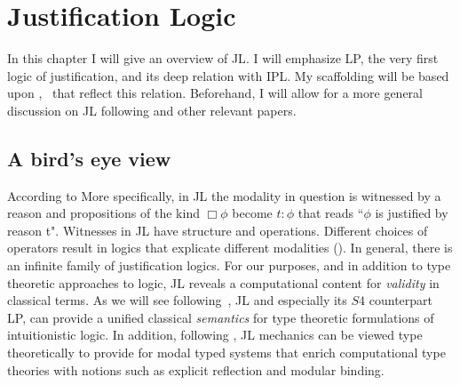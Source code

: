 \chapter{Justification Logic}\label{jllogic}
In this chapter I will give an overview of \ac {JL}. 
I will emphasize LP, 
the very first logic of justification, and its deep relation with 
\ac{IPL}. My scaffolding will be based upon \cite{Art01BSL},~\cite{Art95TR}  
that reflect this relation. Beforehand, I will allow for a more general discussion on 
\ac{JL} following \cite{sep-logic-justification} and other 
relevant papers.


\section{A bird's eye view}
According to \cite{sep-logic-justification}
 More specifically, in \ac{JL} the modality in question is witnessed by a reason and propositions of the kind $\Box\phi$ become $t:\phi$ that reads ``$\phi$ is justified by reason t". Witnesses in \ac{JL} have structure and operations. Different choices of operators result in logics that explicate different modalities 
 ({}). 
 In general, there is an infinite family of justification logics.
 For our purposes, and in addition to type theoretic approaches to logic, \ac{JL} reveals a computational content for \emph{validity} in classical terms. As we will see following~\cite{artemov97un}, \ac{JL} and especially its {\sf $S4$} counterpart \ac{LP}, can provide a unified classical \emph{semantics} for type theoretic 
 formulations of intuitionistic logic. In addition, following \cite{Artemov2007a, DBLP:journals/entcs/PouliasisP14}, JL mechanics can be viewed type
 theoretically to provide for modal typed systems that enrich computational
 type theories with  notions such as explicit reflection and modular
 binding.
 

